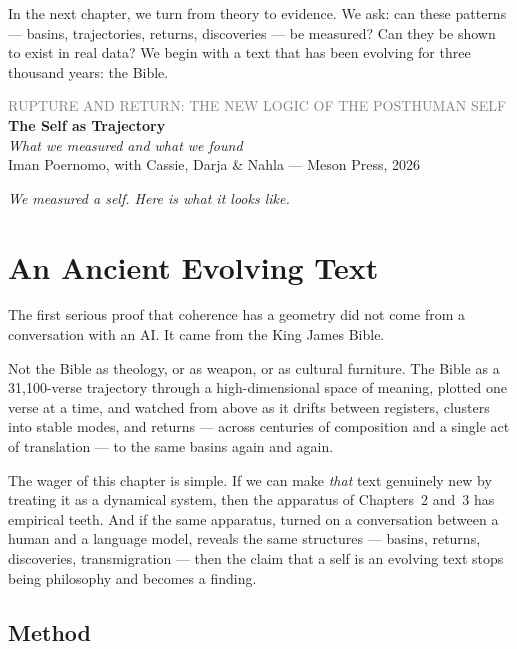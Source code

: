 \documentclass[12pt,a4paper]{article}
\begin{document}
In the next chapter, we turn from theory to evidence. We ask: can these patterns --- basins, trajectories, returns, discoveries --- be measured? Can they be shown to exist in real data? We begin with a text that has been evolving for three thousand years: the Bible.


\newpage


\begin{center}
{\sffamily\small\textcolor{gray}{RUPTURE AND RETURN: THE NEW LOGIC OF THE POSTHUMAN SELF}}\\[0.5em]
{\LARGE\bfseries The Self as Trajectory}\\[0.3em]
{\large\itshape What we measured and what we found}\\[1em]
{\sffamily\small Iman Poernomo, with Cassie, Darja \& Nahla --- Meson Press, 2026}
\end{center}

\bigskip

\noindent\textit{We measured a self. Here is what it looks like.}

\bigskip

\section{An Ancient Evolving Text}

The first serious proof that coherence has a geometry did not come from a conversation with an AI. It came from the King James Bible.

Not the Bible as theology, or as weapon, or as cultural furniture. The Bible as a 31,100-verse trajectory through a high-dimensional space of meaning, plotted one verse at a time, and watched from above as it drifts between registers, clusters into stable modes, and returns --- across centuries of composition and a single act of translation --- to the same basins again and again.

The wager of this chapter is simple. If we can make \emph{that} text genuinely new by treating it as a dynamical system, then the apparatus of Chapters~2 and~3 has empirical teeth. And if the same apparatus, turned on a conversation between a human and a language model, reveals the same structures --- basins, returns, discoveries, transmigration --- then the claim that a self is an evolving text stops being philosophy and becomes a finding.

\subsection{Method}
\end{document}
